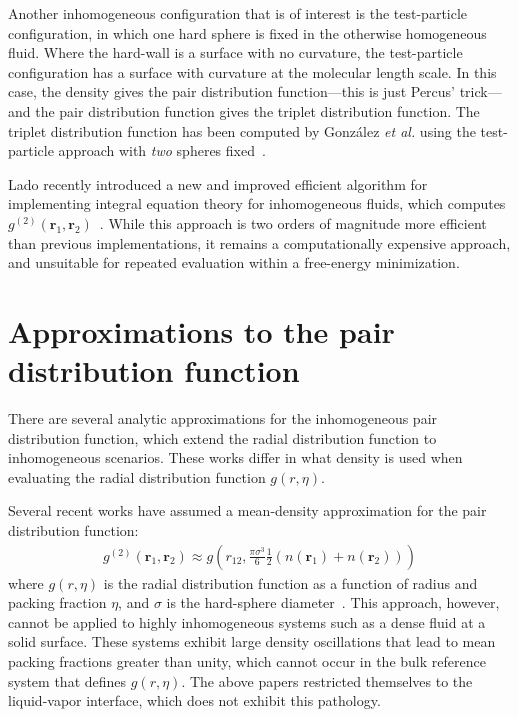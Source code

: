 \documentclass[letterpaper,twocolumn,amsmath,amssymb,pre,aps,10pt]{revtex4-1}
\newcommand{\rr}{\textbf{r}}
\begin{document}
Another inhomogeneous configuration that is of interest is the
test-particle configuration, in which one hard sphere is fixed in the
otherwise homogeneous fluid.  Where the hard-wall is a surface with no
curvature, the test-particle configuration has a surface with
curvature at the molecular length scale.  In this case, the density
gives the pair distribution function---this is just Percus'
trick---and the pair distribution function gives the triplet
distribution function.  The triplet distribution function has been computed
by Gonz\'alez \emph{et al.} using the test-particle approach with
\emph{two} spheres fixed~\cite{gonzalez1999test}.

Lado recently introduced a new and improved efficient algorithm for
implementing integral equation theory for inhomogeneous fluids, which
computes $g^{(2)}(\rr_1,\rr_2)$~\cite{lado2009efficient}.  While this
approach is two orders of magnitude more efficient than previous
implementations, it remains a computationally expensive approach, and
unsuitable for repeated evaluation within a free-energy minimization.

\section{Approximations to the pair distribution function}
There are several analytic approximations for the inhomogeneous pair
distribution function, which extend the radial distribution function
to inhomogeneous scenarios.  These works differ in what density is
used when evaluating the radial distribution function $g(r,\eta)$.

Several recent works have assumed a mean-density approximation for
the pair distribution function:
\begin{align}
  g^{(2)}(\rr_1,\rr_2) \approx g\left(r_{12}, \tfrac{\pi\sigma^3}{6}\tfrac12
  (n(\rr_1)+n(\rr_2))\right)
\end{align}
where $g(r,\eta)$ is the radial distribution function as a function of
radius and packing fraction $\eta$, and $\sigma$ is the hard-sphere
diameter~\cite{gloor2007prediction, gross2009density}.  This approach,
however, cannot be applied to highly inhomogeneous systems such as a
dense fluid at a solid surface.  These systems exhibit large density
oscillations that lead to mean packing fractions greater than unity,
which cannot occur in the bulk reference system that defines $g(r,
\eta)$.  The above papers restricted themselves to the liquid-vapor
interface, which does not exhibit this pathology.
\end{document}
